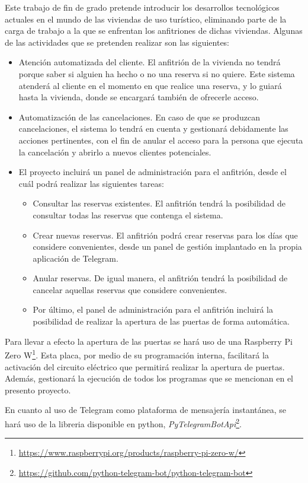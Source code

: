 \noindent Este trabajo de fin de grado pretende introducir los desarrollos tecnológicos actuales en el mundo de las viviendas de uso turístico, eliminando parte de la carga de trabajo a la que se enfrentan los anfitriones de dichas viviendas. Algunas de las actividades que se pretenden realizar son las siguientes:
\begin{itemize}
\item Atención automatizada del cliente. El anfitrión de la vivienda no tendrá porque saber si alguien ha hecho o no una reserva si no quiere. Este sistema atenderá al cliente en el momento en que realice una reserva, y lo guiará hasta la vivienda, donde se encargará también de ofrecerle acceso.
\item Automatización de las cancelaciones. En caso de que se produzcan cancelaciones, el sistema lo tendrá en cuenta y gestionará debidamente las acciones pertinentes, con el fin de anular el acceso para la persona que ejecuta la cancelación y abrirlo a nuevos clientes potenciales.
\item El proyecto incluirá un panel de administración para el anfitrión, desde el cuál podrá realizar las siguientes tareas:
\begin{itemize}
\item Consultar las reservas existentes. El anfitrión tendrá la posibilidad de consultar todas las reservas que contenga el sistema.
\item Crear nuevas reservas. El anfitrión podrá crear reservas para los días que considere convenientes, desde un panel de gestión implantado en la propia aplicación de Telegram.
\item Anular reservas. De igual manera, el anfitrión tendrá la posibilidad de cancelar aquellas reservas que considere convenientes.
\item Por último, el panel de administración para el anfitrión incluirá la posibilidad de realizar la apertura de las puertas de forma automática.
\end{itemize}
\end{itemize}
Para llevar a efecto la apertura de las puertas se hará uso de una Raspberry Pi Zero W\footnote{\url{https://www.raspberrypi.org/products/raspberry-pi-zero-w/}}. Esta placa, por medio de su programación interna, facilitará la activación del circuito eléctrico que permitirá realizar la apertura de puertas. Además, gestionará la ejecución de todos los programas que se mencionan en el presento proyecto.

En cuanto al uso de Telegram como plataforma de mensajería instantánea, se hará uso de la libreria disponible en python, \emph{PyTelegramBotApi}\footnote{\url{https://github.com/python-telegram-bot/python-telegram-bot}}.

